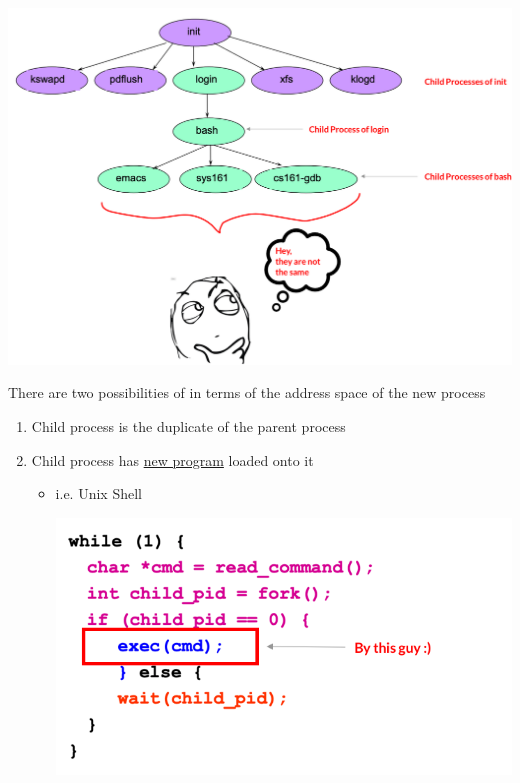 \documentclass[12pt]{article}
\begin{document}
\begin{itemize}
\begin{itemize}
        \begin{center}
        \includegraphics[width=\linewidth]{../images/week_1_notes_1_10.png}
        \end{center}

        \bigskip

        There are two possibilities of in terms of the address space of the new
        process

        \bigskip

        \begin{enumerate}[1.]
            \item Child process is the duplicate of the parent process
            \item Child process has \underline{new program} loaded onto it
            \begin{itemize}
                \item i.e. Unix Shell

                \begin{center}
                \includegraphics[width=0.8\linewidth]{../images/week_1_notes_1_11.png}
                \end{center}


\end{itemize}
\end{enumerate}
\end{itemize}
\end{itemize}
\end{document}
